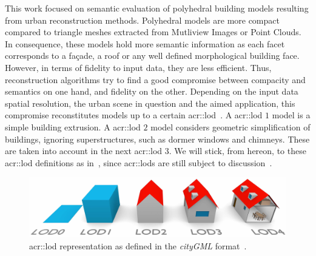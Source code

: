 \documentclass[runningheads]{llncs}
\begin{document}
	This work focused on semantic evaluation of polyhedral building models resulting from urban reconstruction methods. Polyhedral models are more compact compared to triangle meshes extracted from Mutliview Images or Point Clouds. In consequence, these models hold more semantic information as each facet corresponds to a fa\c{c}ade, a roof or any well defined morphological building face. However, in terms of fidelity to input data, they are less efficient. Thus, reconstruction algorithms try to find a good compromise between compacity and semantics on one hand, and fidelity on the other. Depending on the input data spatial resolution, the urban scene in question and the aimed application, this compromise reconstitutes models up to a certain \acrfull{acr::lod}~\cite{kolbe2005citygml}. A \acrshort{acr::lod} $1$ model is a simple building extrusion. A \acrshort{acr::lod} $2$ model considers geometric simplification of buildings, ignoring superstructures, such as dormer windows and chimneys. These are taken into account in the next \acrshort{acr::lod} $3$. We will stick, from hereon, to these \acrshort{acr::lod} definitions as in~\cite{verdie2015lod}, since \glspl{acr::lod} are still subject to discussion~\cite{2016_ceus_improved_lod}.
	\begin{figure}[H]
		\begin{center}
			\includegraphics[width=\textwidth]{images/citygml_lod}
			\caption{\label{fig::lods_citygml} \acrshort{acr::lod} representation as defined in the \emph{cityGML} format~\cite{kolbe2005citygml}.}
		\end{center}
	\end{figure}
	
\end{document}
